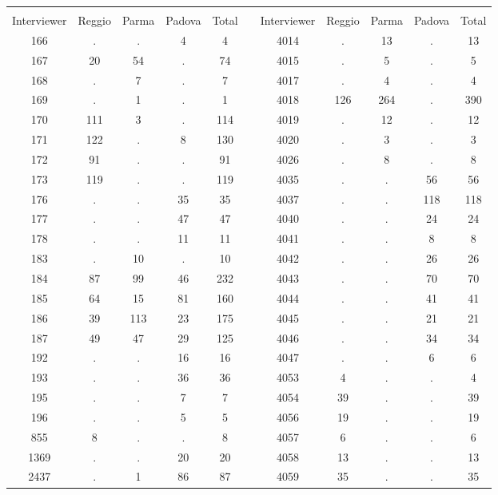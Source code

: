 \begin{tabular}{*{5}{c} C{.5cm} *{5}{c}} \\
  \\[-5pt]
 Interviewer & Reggio & Parma & Padova & Total && Interviewer & Reggio & Parma & Padova & Total \\
 
 166 & . & . & 4 & 4 && 4014 & . & 13 & . & 13 \\[3pt] 
 167 & 20 & 54 & . & 74 && 4015 & . & 5 & . & 5 \\[3pt] 
 168 & . & 7 & . & 7 && 4017 & . & 4 & . & 4 \\[3pt] 
 169 & . & 1 & . & 1 && 4018 & 126 & 264 & . & 390 \\[3pt] 
 170 & 111 & 3 & . & 114 && 4019 & . & 12 & . & 12 \\[3pt] 
 171 & 122 & . & 8 & 130 && 4020 & . & 3 & . & 3 \\[3pt] 
 172 & 91 & . & . & 91 && 4026 & . & 8 & . & 8 \\[3pt] 
 173 & 119 & . & . & 119 && 4035 & . & . & 56 & 56 \\[3pt] 
 176 & . & . & 35 & 35 && 4037 & . & . & 118 & 118 \\[3pt] 
 177 & . & . & 47 & 47 && 4040 & . & . & 24 & 24 \\[3pt] 
 178 & . & . & 11 & 11 && 4041 & . & . & 8 & 8 \\[3pt] 
 183 & . & 10 & . & 10 && 4042 & . & . & 26 & 26 \\[3pt] 
 184 & 87 & 99 & 46 & 232 && 4043 & . & . & 70 & 70 \\[3pt] 
 185 & 64 & 15 & 81 & 160 && 4044 & . & . & 41 & 41 \\[3pt] 
 186 & 39 & 113 & 23 & 175 && 4045 & . & . & 21 & 21 \\[3pt] 
 187 & 49 & 47 & 29 & 125 && 4046 & . & . & 34 & 34 \\[3pt] 
 192 & . & . & 16 & 16 && 4047 & . & . & 6 & 6 \\[3pt] 
 193 & . & . & 36 & 36 && 4053 & 4 & . & . & 4 \\[3pt] 
 195 & . & . & 7 & 7 && 4054 & 39 & . & . & 39 \\[3pt] 
 196 & . & . & 5 & 5 && 4056 & 19 & . & . & 19 \\[3pt] 
 855 & 8 & . & . & 8 && 4057 & 6 & . & . & 6 \\[3pt] 
 1369 & . & . & 20 & 20 && 4058 & 13 & . & . & 13 \\[3pt] 
 2437 & . & 1 & 86 & 87 && 4059 & 35 & . & . & 35 \\[3pt] 

\end{tabular}
